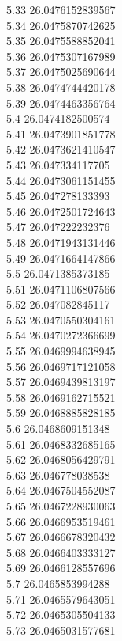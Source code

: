 {5.33	26.0476152839567\\
5.34	26.0475870742625\\
5.35	26.0475588852041\\
5.36	26.0475307167989\\
5.37	26.0475025690644\\
5.38	26.0474744420178\\
5.39	26.0474463356764\\
5.4	26.0474182500574\\
5.41	26.0473901851778\\
5.42	26.0473621410547\\
5.43	26.047334117705\\
5.44	26.0473061151455\\
5.45	26.047278133393\\
5.46	26.0472501724643\\
5.47	26.047222232376\\
5.48	26.0471943131446\\
5.49	26.0471664147866\\
5.5	26.0471385373185\\
5.51	26.0471106807566\\
5.52	26.047082845117\\
5.53	26.0470550304161\\
5.54	26.0470272366699\\
5.55	26.0469994638945\\
5.56	26.0469717121058\\
5.57	26.0469439813197\\
5.58	26.0469162715521\\
5.59	26.0468885828185\\
5.6	26.0468609151348\\
5.61	26.0468332685165\\
5.62	26.0468056429791\\
5.63	26.046778038538\\
5.64	26.0467504552087\\
5.65	26.0467228930063\\
5.66	26.0466953519461\\
5.67	26.0466678320432\\
5.68	26.0466403333127\\
5.69	26.0466128557696\\
5.7	26.0465853994288\\
5.71	26.0465579643051\\
5.72	26.0465305504133\\
5.73	26.0465031577681\\
}
